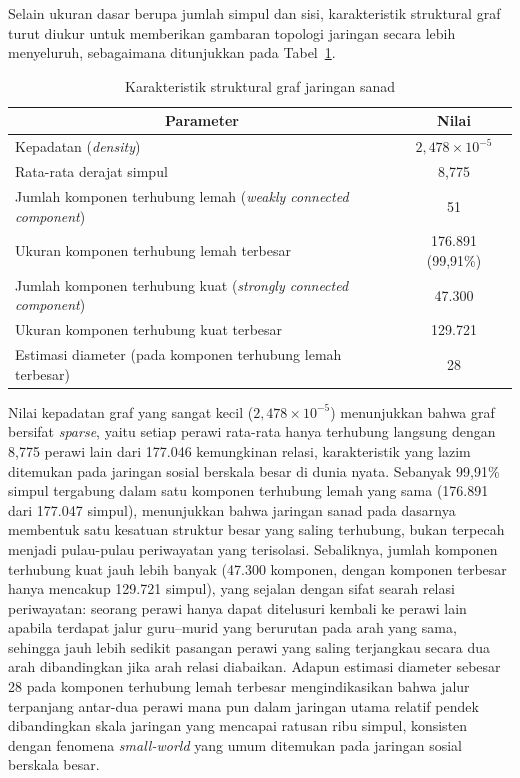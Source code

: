 Selain ukuran dasar berupa jumlah simpul dan sisi, karakteristik struktural graf turut diukur untuk memberikan gambaran topologi jaringan secara lebih menyeluruh, sebagaimana ditunjukkan pada Tabel~\ref{tab:struktur-graf}.

\begin{table}[H]
\centering
\caption{Karakteristik struktural graf jaringan sanad}
\label{tab:struktur-graf}
\renewcommand{\arraystretch}{1.3}
\begin{tabular}{|p{7cm}|c|}
\hline
\multicolumn{1}{|c|}{\textbf{Parameter}} & \multicolumn{1}{c|}{\textbf{Nilai}} \\
\hline
Kepadatan (\textit{density}) & $2,478 \times 10^{-5}$ \\
\hline
Rata-rata derajat simpul & 8,775 \\
\hline
Jumlah komponen terhubung lemah (\textit{weakly connected component}) & 51 \\
\hline
Ukuran komponen terhubung lemah terbesar & 176.891 (99,91\%) \\
\hline
Jumlah komponen terhubung kuat (\textit{strongly connected component}) & 47.300 \\
\hline
Ukuran komponen terhubung kuat terbesar & 129.721 \\
\hline
Estimasi diameter (pada komponen terhubung lemah terbesar) & 28 \\
\hline
\end{tabular}
\end{table}

Nilai kepadatan graf yang sangat kecil ($2,478 \times 10^{-5}$) menunjukkan bahwa graf bersifat \textit{sparse}, yaitu setiap perawi rata-rata hanya terhubung langsung dengan 8,775 perawi lain dari 177.046 kemungkinan relasi, karakteristik yang lazim ditemukan pada jaringan sosial berskala besar di dunia nyata. Sebanyak 99,91\% simpul tergabung dalam satu komponen terhubung lemah yang sama (176.891 dari 177.047 simpul), menunjukkan bahwa jaringan sanad pada dasarnya membentuk satu kesatuan struktur besar yang saling terhubung, bukan terpecah menjadi pulau-pulau periwayatan yang terisolasi. Sebaliknya, jumlah komponen terhubung kuat jauh lebih banyak (47.300 komponen, dengan komponen terbesar hanya mencakup 129.721 simpul), yang sejalan dengan sifat searah relasi periwayatan: seorang perawi hanya dapat ditelusuri kembali ke perawi lain apabila terdapat jalur guru--murid yang berurutan pada arah yang sama, sehingga jauh lebih sedikit pasangan perawi yang saling terjangkau secara dua arah dibandingkan jika arah relasi diabaikan. Adapun estimasi diameter sebesar 28 pada komponen terhubung lemah terbesar mengindikasikan bahwa jalur terpanjang antar-dua perawi mana pun dalam jaringan utama relatif pendek dibandingkan skala jaringan yang mencapai ratusan ribu simpul, konsisten dengan fenomena \textit{small-world} yang umum ditemukan pada jaringan sosial berskala besar.

